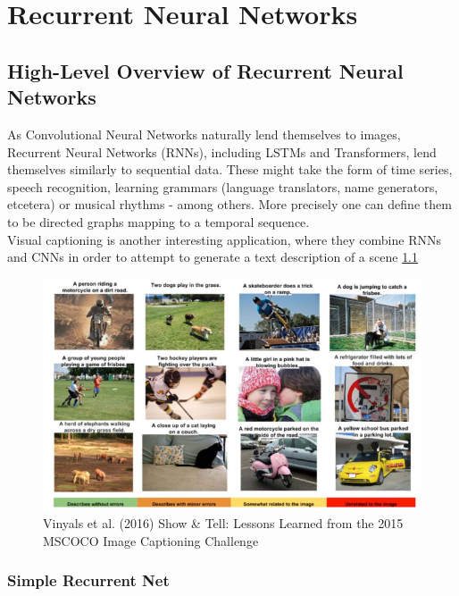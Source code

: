 \chapter{Recurrent Neural Networks}



\section{ High-Level Overview of Recurrent Neural Networks }

As Convolutional Neural Networks naturally lend themselves to images, Recurrent Neural Networks (RNNs),  including LSTMs and Transformers, lend themselves similarly to sequential data. These might take the form of time series, speech recognition, learning grammars (language translators, name generators, etcetera) or musical rhythms - among others. More precisely one can define them to be directed graphs mapping to a temporal sequence.\\

Visual captioning \cite{DBLP:journals/corr/VinyalsTBE16} is another interesting application, where they combine RNNs and CNNs in order to attempt to generate a text description of a scene \ref{fig:visual_caption}

\begin{figure}
    \centering
    \includegraphics[width=\textwidth]{figs/image_captioning.png}
    \caption{Vinyals et al. (2016) Show \& Tell: Lessons Learned from the 2015 MSCOCO Image Captioning Challenge}
    \label{fig:visual_caption}
\end{figure}

\subsection{Simple Recurrent Net}
\label{sec:SimpleRecNet}

